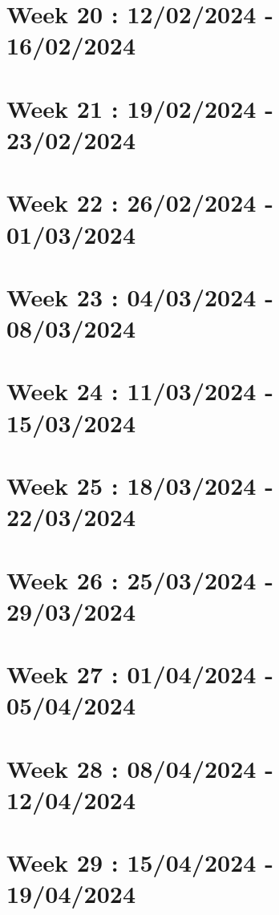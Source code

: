 \documentclass[french]{article}
\begin{document}
	\section{Week 20 : 12/02/2024 - 16/02/2024}
	

	\section{Week 21 : 19/02/2024 - 23/02/2024}
	

	\section{Week 22 : 26/02/2024 - 01/03/2024}
	

	\section{Week 23 : 04/03/2024 - 08/03/2024}
	

	\section{Week 24 : 11/03/2024 - 15/03/2024}
	

	\section{Week 25 : 18/03/2024 - 22/03/2024}
	

	\section{Week 26 : 25/03/2024 - 29/03/2024}
	

	\section{Week 27 : 01/04/2024 - 05/04/2024}
	

	\section{Week 28 : 08/04/2024 - 12/04/2024}
	

	\section{Week 29 : 15/04/2024 - 19/04/2024}
	
\end{document}
